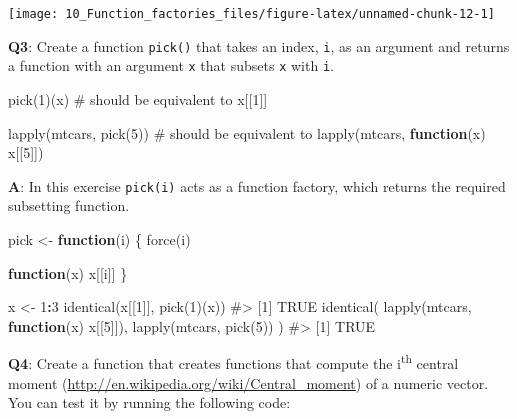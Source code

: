\documentclass[
]{krantz}
\makeatletter
\newenvironment{Shaded}{\begin{snugshade}}{\end{snugshade}}
\newcommand{\CommentTok}[1]{\textcolor[rgb]{0.56,0.35,0.01}{\textit{#1}}}
\newcommand{\ControlFlowTok}[1]{\textcolor[rgb]{0.13,0.29,0.53}{\textbf{#1}}}
\newcommand{\DecValTok}[1]{\textcolor[rgb]{0.00,0.00,0.81}{#1}}
\newcommand{\KeywordTok}[1]{\textcolor[rgb]{0.13,0.29,0.53}{\textbf{#1}}}
\newcommand{\NormalTok}[1]{#1}
\newcommand{\OperatorTok}[1]{\textcolor[rgb]{0.81,0.36,0.00}{\textbf{#1}}}
\newcommand{\StringTok}[1]{\textcolor[rgb]{0.31,0.60,0.02}{#1}}
\renewcommand{\href}[2]{#2 (\url{#1})}
\newenvironment{kframe}{%
\medskip{}
\setlength{\fboxsep}{.8em}
 \def\at@end@of@kframe{}%
 \ifinner\ifhmode%
  \def\at@end@of@kframe{\end{minipage}}%
  \begin{minipage}{\columnwidth}%
 \fi\fi%
 \def\FrameCommand##1{\hskip\@totalleftmargin \hskip-\fboxsep
 \colorbox{shadecolor}{##1}\hskip-\fboxsep
     \hskip-\linewidth \hskip-\@totalleftmargin \hskip\columnwidth}%
 \MakeFramed {\advance\hsize-\width
   \@totalleftmargin\z@ \linewidth\hsize
   \@setminipage}}%
 {\par\unskip\endMakeFramed%
 \at@end@of@kframe}
\renewenvironment{Shaded}{\begin{kframe}}{\end{kframe}}
\renewcommand{\KeywordTok} [1]{\textcolor[rgb]{0.00,0.44,0.13}{{#1}}}
\renewcommand{\DecValTok}  [1]{\textcolor[rgb]{0.25,0.63,0.44}{{#1}}}
\renewcommand{\StringTok}  [1]{\textcolor[rgb]{0.25,0.44,0.63}{{#1}}}
\renewcommand{\CommentTok} [1]{\textcolor[rgb]{0.38,0.63,0.69}{{#1}}}
\renewcommand{\NormalTok}  [1]{{#1}}
\makeatother
\begin{document}
\begin{center}\texttt{[image: 10\_Function\_factories\_files/figure-latex/unnamed-chunk-12-1]} \end{center}

\textbf{{Q3}}: Create a function \texttt{pick()} that takes an index, \texttt{i}, as an argument and returns a function with an argument \texttt{x} that subsets \texttt{x} with \texttt{i}.

\begin{Shaded}
\begin{Highlighting}[]
\KeywordTok{pick}\NormalTok{(}\DecValTok{1}\NormalTok{)(x)}
\CommentTok{# should be equivalent to}
\NormalTok{x[[}\DecValTok{1}\NormalTok{]]}

\KeywordTok{lapply}\NormalTok{(mtcars, }\KeywordTok{pick}\NormalTok{(}\DecValTok{5}\NormalTok{))}
\CommentTok{# should be equivalent to}
\KeywordTok{lapply}\NormalTok{(mtcars, }\ControlFlowTok{function}\NormalTok{(x) x[[}\DecValTok{5}\NormalTok{]])}
\end{Highlighting}
\end{Shaded}

\textbf{{A}}: In this exercise \texttt{pick(i)} acts as a function factory, which returns the required subsetting function.

\begin{Shaded}
\begin{Highlighting}[]
\NormalTok{pick <-}\StringTok{ }\ControlFlowTok{function}\NormalTok{(i) \{}
  \KeywordTok{force}\NormalTok{(i)}
  
  \ControlFlowTok{function}\NormalTok{(x) x[[i]]}
\NormalTok{\}}

\NormalTok{x <-}\StringTok{ }\DecValTok{1}\OperatorTok{:}\DecValTok{3}
\KeywordTok{identical}\NormalTok{(x[[}\DecValTok{1}\NormalTok{]], }\KeywordTok{pick}\NormalTok{(}\DecValTok{1}\NormalTok{)(x))}
\CommentTok{#> [1] TRUE}
\KeywordTok{identical}\NormalTok{(}
  \KeywordTok{lapply}\NormalTok{(mtcars, }\ControlFlowTok{function}\NormalTok{(x) x[[}\DecValTok{5}\NormalTok{]]),}
  \KeywordTok{lapply}\NormalTok{(mtcars, }\KeywordTok{pick}\NormalTok{(}\DecValTok{5}\NormalTok{))}
\NormalTok{)}
\CommentTok{#> [1] TRUE}
\end{Highlighting}
\end{Shaded}

\textbf{{Q4}}: Create a function that creates functions that compute the i\textsuperscript{th} \href{http://en.wikipedia.org/wiki/Central_moment}{central moment} of a numeric vector. You can test it by running the following code:
\end{document}
